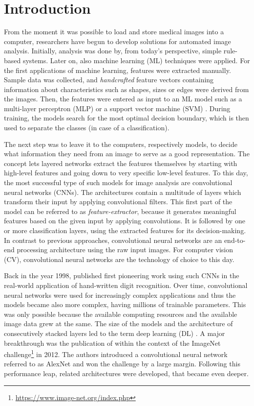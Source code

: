 \section{Introduction}
\label{sec:Introduction}

From the moment it was possible to load and store medical images into a computer, researchers have begun to develop solutions for automated image analysis.
Initially, analysis was done by, from today's perspective, simple rule-based systems.
Later on, also machine learning (ML) techniques were applied. For the first applications of machine learning, features were extracted manually. Sample data was collected, and \textit{handcrafted} feature vectors containing information about characteristics such as shapes, sizes or edges were derived from the images. 
Then, the features were entered as input to an ML model such as a multi-layer perceptron (MLP) \citep{Rumelhart1986LearningErrors} or a support vector machine (SVM) \citep{Vapnik1995TheTheory}. During training, the models search for the most optimal decision boundary, which is then used to separate the classes (in case of a classification).

The next step was to leave it to the computers, respectively models, to decide what information they need from an image to serve as a good representation. The concept lets layered networks extract the features themselves by starting with high-level features and going down to very specific low-level features. To this day, the most successful type of such models for image analysis are convolutional neural networks (CNNs). The architectures contain a multitude of layers which transform their input by applying convolutional filters. This first part of the model can be referred to as \textit{feature-extractor}, because it generates meaningful features based on the given input by applying convolutions. It is followed by one or more classification layers, using the extracted features for its decision-making. In contrast to previous approaches, convolutional neural networks are an end-to-end processing architecture using the raw input images. For computer vision (CV), convolutional neural networks are the technology of choice to this day.

Back in the year 1998, \cite{LeCun1998Gradient-basedRecognition} published first pioneering work using such CNNs in the real-world application of hand-written digit recognition.
Over time, convolutional neural networks were used for increasingly complex applications and thus the models became also more complex, having millions of trainable parameters.
This was only possible because the available computing resources and the available image data grew at the same.
The size of the models and the architecture of consecutively stacked layers led to the term deep learning (DL) \citep{Lecun2015DeepLearning}.
A major breakthrough was the publication of \citep{NIPS2012_c399862d} within the context of the ImageNet challenge\footnote{\url{https://www.image-net.org/index.php}} in 2012. The authors introduced a convolutional neural network referred to as AlexNet and won the challenge by a large margin.
Following this performance leap, related architectures were developed, that became even deeper.

